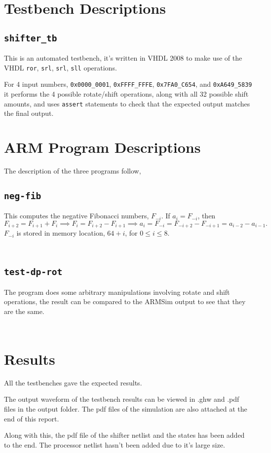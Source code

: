 \documentclass[a4paper]{scrartcl}
\renewcommand{\tt}{\texttt}
\newcommand{\addwaveformpdf}[2][true]{
	
}
\newcommand{\addprogramcode}[1]{%
\begin{minipage}{.25\textwidth}%
    \inputminted[linenos]{text}{../code/arm/binary/#1.txt}%
\end{minipage}%
\begin{minipage}{.7\textwidth}%
    \inputminted{arm}{../code/arm/assembly/#1.s}%
\end{minipage}%
}
\begin{document}
\section{Testbench Descriptions}

\subsection{\texttt{shifter\_tb}}
This is an automated testbench, it's written in VHDL 2008 to make use of the VHDL \tt{ror}, \tt{srl}, \tt{srl}, \tt{sll} operations.

For 4 input numbers, \tt{0x0000_0001}, \tt{0xFFFF_FFFE}, \tt{0x7FA0_C654}, and \tt{0xA649_5839} it performs the 4 possible rotate/shift operations, along with all 32 possible shift amounts, and uses \tt{assert} statements to check that the expected output matches the final output.

\section{ARM Program Descriptions}
The description of the three programs follow,

\subsection{\texttt{neg-fib}}
This computes the negative Fibonacci numbers, $F_{-i}$. If $a_i = F_{-i}$, then
\[F_{i + 2} = F_{i + 1} + F_{i} \implies F_i = F_{i + 2} - F_{i + 1} \implies a_i = F_{-i} = F_{-i + 2} - F_{-i + 1} = a_{i - 2} - a_{i - 1}.\]
$F_{-i}$ is stored in memory location, $64 + i$, for $0 \le i \le 8$.

\addprogramcode{neg-fib}
\clearpage

\subsection{\texttt{test-dp-rot}}
The program does some arbitrary manipulations involving rotate and shift operations, the result can be compared to the ARMSim output to see that they are the same.

\addprogramcode{test-dp-rot}

\section{Results}
All the testbenches gave the expected results.

The output waveform of the testbench results can be viewed in .ghw and .pdf files in the output folder. The pdf files of the simulation are also attached at the end of this report.

Along with this, the pdf file of the shifter netlist and the states has been added to the end. The processor netlist hasn't been added due to it's large size.

\addwaveformpdf{waveforms/shifter_tb}
\addwaveformpdf{arm-tests/neg-fib}
\addwaveformpdf{arm-tests/test-dp-rot}
\addwaveformpdf{synthesis/processor_control_state}
\addwaveformpdf[false]{synthesis/shifter_netlist}
\end{document}
